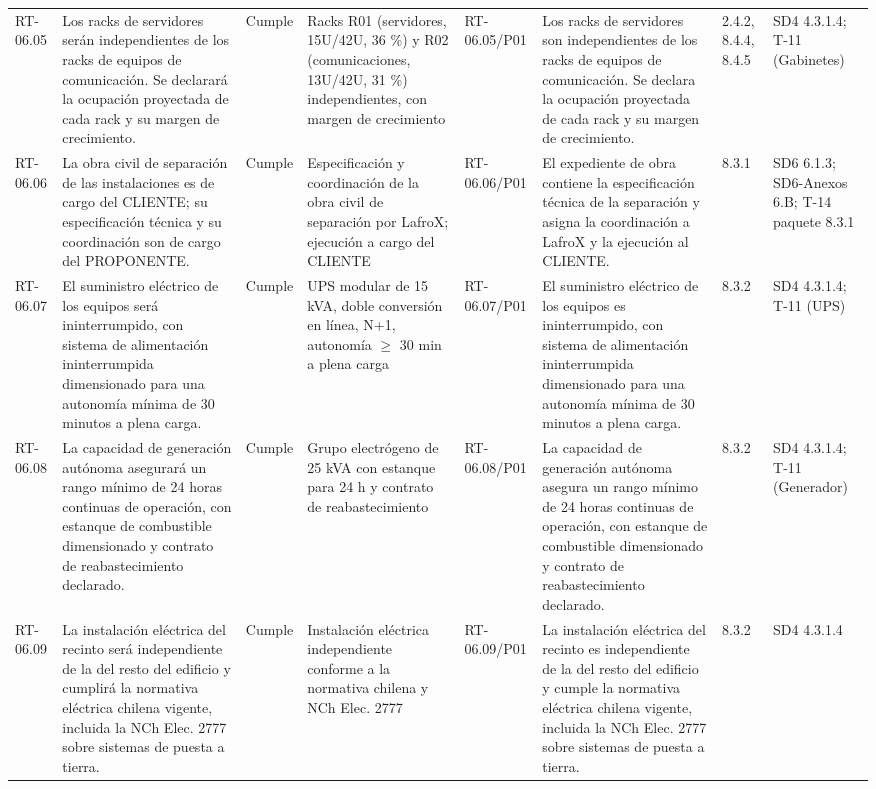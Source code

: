 \documentclass[oficio,firma,final]{lafrox}
\begin{document}
\begin{landscape}
{\begin{longtable}{@{}F{0.054} F{0.173} F{0.061} F{0.191} F{0.106} F{0.180} F{0.067} F{0.168}@{}}
  RT-06.05 & Los racks de servidores serán independientes de los racks de equipos de comunicación. Se declarará la ocupación proyectada de cada rack y su margen de crecimiento. & Cumple & Racks R01 (servidores, 15U/42U, 36 \%) y R02 (comunicaciones, 13U/42U, 31 \%) independientes, con margen de crecimiento & RT-06.05/\allowbreak{}P01 & Los racks de servidores son independientes de los racks de equipos de comunicación. Se declara la ocupación proyectada de cada rack y su margen de crecimiento. & 2.4.2, 8.4.4, 8.4.5 & SD4 4.3.1.4; T-11 (Gabinetes)  \\
  RT-06.06 & La obra civil de separación de las instalaciones es de cargo del CLIENTE; su especificación técnica y su coordinación son de cargo del PROPONENTE. & Cumple & Especificación y coordinación de la obra civil de separación por LafroX; ejecución a cargo del CLIENTE & RT-06.06/\allowbreak{}P01 & El expediente de obra contiene la especificación técnica de la separación y asigna la coordinación a LafroX y la ejecución al CLIENTE. & 8.3.1 & SD6 6.1.3; SD6-Anexos 6.B; T-14 paquete 8.3.1  \\
  RT-06.07 & El suministro eléctrico de los equipos será ininterrumpido, con sistema de alimentación ininterrumpida dimensionado para una autonomía mínima de 30 minutos a plena carga. & Cumple & UPS modular de 15 kVA, doble conversión en línea, N+1, autonomía $\geq$ 30 min a plena carga & RT-06.07/\allowbreak{}P01 & El suministro eléctrico de los equipos es ininterrumpido, con sistema de alimentación ininterrumpida dimensionado para una autonomía mínima de 30 minutos a plena carga. & 8.3.2 & SD4 4.3.1.4; T-11 (UPS)  \\
  RT-06.08 & La capacidad de generación autónoma asegurará un rango mínimo de 24 horas continuas de operación, con estanque de combustible dimensionado y contrato de reabastecimiento declarado. & Cumple & Grupo electrógeno de 25 kVA con estanque para 24 h y contrato de reabastecimiento & RT-06.08/\allowbreak{}P01 & La capacidad de generación autónoma asegura un rango mínimo de 24 horas continuas de operación, con estanque de combustible dimensionado y contrato de reabastecimiento declarado. & 8.3.2 & SD4 4.3.1.4; T-11 (Generador)  \\
  RT-06.09 & La instalación eléctrica del recinto será independiente de la del resto del edificio y cumplirá la normativa eléctrica chilena vigente, incluida la NCh Elec. 2777 sobre sistemas de puesta a tierra. & Cumple & Instalación eléctrica independiente conforme a la normativa chilena y NCh Elec. 2777 & RT-06.09/\allowbreak{}P01 & La instalación eléctrica del recinto es independiente de la del resto del edificio y cumple la normativa eléctrica chilena vigente, incluida la NCh Elec. 2777 sobre sistemas de puesta a tierra. & 8.3.2 & SD4 4.3.1.4  \\

\end{longtable}}
\end{landscape}
\end{document}
